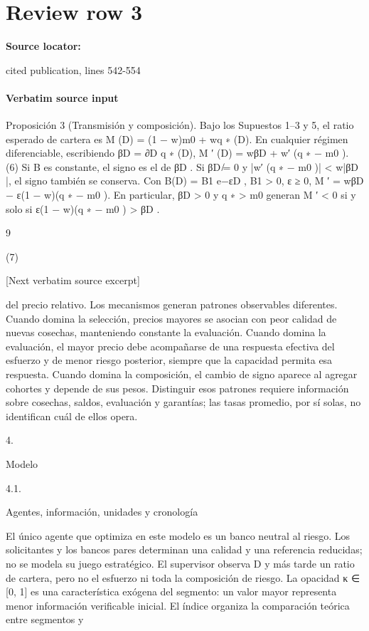 \documentclass[10pt]{article}
\begin{document}
\section*{Review row 3}
\textbf{Source locator:} {\footnotesize\raggedright cited publication, lines 542-\allowbreak{}554\par}
\paragraph{Verbatim source input}
\begin{ReviewVerbatim}
Proposición 3 (Transmisión y composición). Bajo los Supuestos 1–3 y 5, el ratio esperado de
cartera es M (D) = (1 − w)m0 + wq ∗ (D). En cualquier régimen diferenciable, escribiendo βD =
∂D q ∗ (D),
M ′ (D) = wβD + w′ (q ∗ − m0 ).
(6)
Si B es constante, el signo es el de βD . Si βD ̸= 0 y |w′ (q ∗ − m0 )| < w|βD |, el signo también se
conserva. Con B(D) = B1 e−εD , B1 > 0, ε ≥ 0,
M ′ = w{βD − ε(1 − w)(q ∗ − m0 )}.
En particular, βD > 0 y q ∗ > m0 generan M ′ < 0 si y solo si ε(1 − w)(q ∗ − m0 ) > βD .

9

(7)

[Next verbatim source excerpt]

del precio relativo.
Los mecanismos generan patrones observables diferentes. Cuando domina la selección, precios
mayores se asocian con peor calidad de nuevas cosechas, manteniendo constante la evaluación.
Cuando domina la evaluación, el mayor precio debe acompañarse de una respuesta efectiva del
esfuerzo y de menor riesgo posterior, siempre que la capacidad permita esa respuesta. Cuando
domina la composición, el cambio de signo aparece al agregar cohortes y depende de sus pesos.
Distinguir esos patrones requiere información sobre cosechas, saldos, evaluación y garantías; las
tasas promedio, por sí solas, no identiﬁcan cuál de ellos opera.

4.

Modelo

4.1.

Agentes, información, unidades y cronología

El único agente que optimiza en este modelo es un banco neutral al riesgo. Los solicitantes y los
bancos pares determinan una calidad y una referencia reducidas; no se modela su juego estratégico.
El supervisor observa D y más tarde un ratio de cartera, pero no el esfuerzo ni toda la composición de
riesgo. La opacidad κ ∈ [0, 1] es una característica exógena del segmento: un valor mayor representa
menor información veriﬁcable inicial. El índice organiza la comparación teórica entre segmentos y


\end{ReviewVerbatim}
\end{document}
